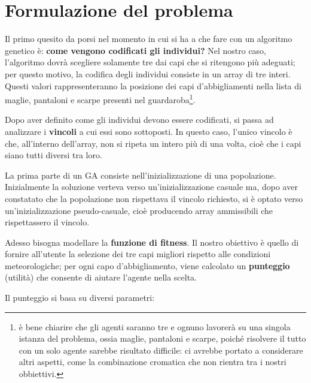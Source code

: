 \documentclass[a4paper, 11pt, oneside]{report}
\begin{document}
            \newpage
            \section{Formulazione del problema}
            Il primo quesito da porsi nel momento in cui si ha a che fare con un algoritmo genetico è: \textbf{come vengono
            codificati gli individui?} Nel nostro caso, l'algoritmo dovrà scegliere solamente tre dai capi che si ritengono
            più adeguati; per questo motivo, la codifica degli individui consiste in un array di tre interi. Questi valori
            rappresenteranno la posizione dei capi d'abbigliamenti nella lista di maglie, pantaloni e scarpe
            presenti nel guardaroba\footnote{è bene chiarire che gli agenti saranno tre e ognuno lavorerà su una singola
            istanza del problema, ossia maglie, pantaloni e scarpe, poiché risolvere il tutto con un solo agente sarebbe
            risultato difficile: ci avrebbe portato a considerare altri aspetti, come la combinazione
            cromatica che non rientra tra i nostri obbiettivi.}.
            \\
            \par \noindent Dopo aver definito come gli individui devono essere codificati, si passa ad analizzare i \textbf{vincoli} a
            cui essi sono sottoposti. In questo caso, l'unico vincolo è che, all'interno dell'array, non si ripeta un intero
            più di una volta, cioè che i capi siano tutti diversi tra loro.
            \\
            \par \noindent La prima parte di un GA consiste nell'inizializzazione di una popolazione. Inizialmente la soluzione
            verteva verso un'inizializzazione casuale ma, dopo aver constatato che la popolazione non rispettava il vincolo richiesto,
            si è optato verso un'inizializzazione pseudo-casuale, cioè producendo array ammissibili che rispettassero il vincolo.
            \\
            \par \noindent Adesso bisogna modellare la \textbf{funzione di fitness}.
            Il nostro obiettivo è quello di fornire all'utente la selezione dei tre capi migliori rispetto alle condizioni
            meteorologiche; per ogni capo d'abbigliamento, viene calcolato un \textbf{punteggio} (utilità) che consente di aiutare
            l'agente nella scelta.
            \\
            \par \noindent Il punteggio si basa su diversi parametri:
\end{document}

